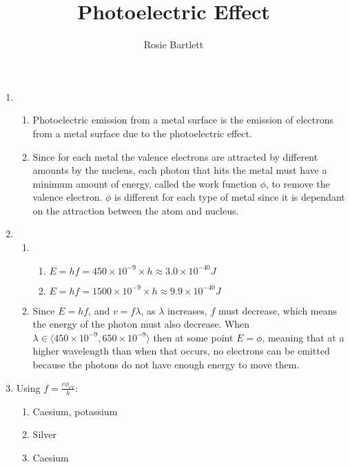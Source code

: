 \documentclass{article}
\title{Photoelectric Effect}
\date{}
\author{Rosie Bartlett}
\begin{document}
\maketitle
\begin{enumerate}
\item \begin{enumerate}
\item Photoelectric emission from a metal surface is the emission of electrons from a metal surface due to the photoelectric effect.

\item Since for each metal the valence electrons are attracted by different amounts by the nucleus, each photon that hits the metal must have a minimum amount of energy, called the work function $\phi$, to remove the valence electron. $\phi$ is different for each type of metal since it is dependant on the attraction between the atom and nucleus.

\end{enumerate}

\item \begin{enumerate}
\item \begin{enumerate}
\item $E=hf=450\times10^{-9}\times h\approx3.0\times10^{-40}J$

\item $E=hf=1500\times10^{-9}\times h\approx9.9\times10^{-40}J$

\end{enumerate}

\item Since $E=hf$, and $v=f\lambda$, as $\lambda$ increases, $f$ must decrease, which means the energy of the photon must also decrease. When $\lambda\in\langle 450\times10^{-9}, 650\times10^{-9} \rangle$ then at some point $E=\phi$, meaning that at a higher wavelength than when that occurs, no electrons can be emitted because the photons do not have enough energy to move them.

\end{enumerate}

\item Using $f=\frac{e\phi_{eV}}{h}$:
\begin{enumerate}
\item Caesium, potassium

\item Silver

\item Caesium


\end{enumerate}
\end{enumerate}
\end{document}

